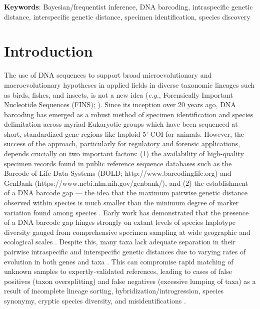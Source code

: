 \documentclass[12pt]{article}
\begin{document}
\textbf{Keywords}: Bayesian/frequentist inference, DNA barcoding, intraspecific genetic \\ distance, interspecific genetic distance, specimen identification, species discovery

\vspace{2mm}

\section{Introduction}

The use of DNA sequences to support broad microevolutionary and macroevolutionary hypotheses in applied fields in diverse taxonomic lineages such as birds, fishes, and insects, is not a new idea (\textit{e.g.}, Forensically Important Nucleotide Sequences (FINS); \citet{bartlett1992fins}). Since its inception over 20 years ago, DNA barcoding \citep{hebert2003biological, hebert2003barcoding} has emerged as a robust method of specimen identification and species delimitation across myriad Eukaryotic groups which have been sequenced at short, standardized gene regions like haploid 5'-COI for animals. However, the success of the approach, particularly for regulatory and forensic applications, depends crucially on two important factors: (1) the availability of high-quality specimen records found in public reference sequence databases such as the Barcode of Life Data Systems (BOLD; http://www.barcodinglife.org) \citep{ratnasingham2007bold} and GenBank (https://www.ncbi.nlm.nih.gov/genbank/), and (2) the establishment of a DNA barcode gap --- the idea that the maximum pairwise genetic distance observed within species is much smaller than the minimum degree of marker variation found among species \citep{meyer2005dna, meier2008use}. Early work has demonstrated that the presence of a DNA barcode gap hinges strongly on extant levels of species haplotype diversity gauged from comprehensive specimen sampling at wide geographic and ecological scales \citep{bergsten2012effect, candek2015dna}. Despite this, many taxa lack adequate separation in their pairwise intraspecific and interspecific genetic distances due to varying rates of evolution in both genes and taxa \citep{pentinsaari2016molecular}. This can compromise rapid matching of unknown samples to expertly-validated references, leading to cases of false positives (taxon oversplitting) and false negatives (excessive lumping of taxa) as a result of incomplete lineage sorting, hybridization/introgression, species \\ synonymy, cryptic species diversity, and misidentifications \citep{hubert2015dna, phillips2022lack}.
\end{document}
